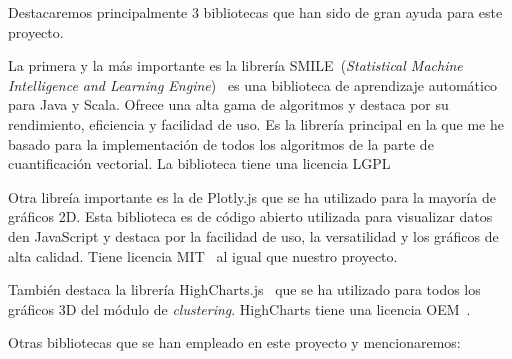 Destacaremos principalmente 3 bibliotecas que han sido de gran ayuda para este proyecto.

La primera y la más importante es la librería SMILE~(\emph{Statistical Machine Intelligence and Learning Engine})~\cite{haifengl:VectorQuantization} es una biblioteca de aprendizaje automático para Java y Scala. Ofrece una alta gama de algoritmos y destaca por su rendimiento, eficiencia y facilidad de uso. Es la librería principal en la que me he basado para la implementación de todos los algoritmos de la parte de cuantificación vectorial. La biblioteca tiene una licencia LGPL~\cite{smile:license}

Otra libreía importante es la de Plotly.js que se ha utilizado para la mayoría de gráficos 2D. Esta biblioteca es de código abierto utilizada para visualizar datos den JavaScript y destaca por la facilidad de uso, la versatilidad y los gráficos de alta calidad. Tiene licencia MIT~\cite{plotly:license} al igual que nuestro proyecto.

También destaca la librería HighCharts.js~\cite{highcharts} que se ha utilizado para todos los gráficos 3D del módulo de \emph{clustering}. HighCharts tiene una licencia OEM~\cite{highcharts:license}.

Otras bibliotecas que se han empleado en este proyecto y mencionaremos:

